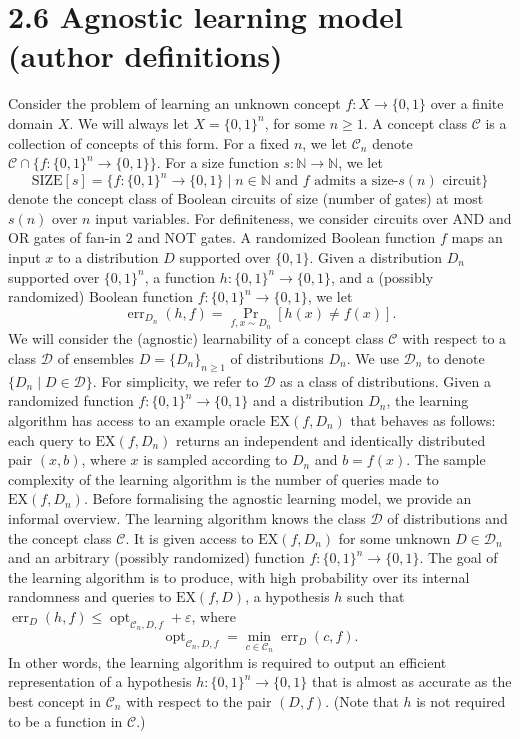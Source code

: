\section*{2.6 Agnostic learning model (author definitions)}
Consider the problem of learning an unknown concept $f:X\to\{0,1\}$ over a finite domain $X$. We will always let $X=\{0,1\}^n$, for some $n\geq1$. A concept class $\mathcal C$ is a collection of concepts of this form. For a fixed $n$, we let $\mathcal C_n$ denote $\mathcal C\cap\{f:\{0,1\}^n\to\{0,1\}\}$. For a size function $s:\mathbb N\to\mathbb N$, we let
\[\mathrm{SIZE}[s]=\{f:\{0,1\}^n\to\{0,1\}\mid n\in\mathbb N\text{ and }f\text{ admits a size-}s(n)\text{ circuit}\}\]
denote the concept class of Boolean circuits of size (number of gates) at most $s(n)$ over $n$ input variables. For definiteness, we consider circuits over AND and OR gates of fan-in $2$ and NOT gates.
A randomized Boolean function $f$ maps an input $x$ to a distribution $D$ supported over $\{0,1\}$. Given a distribution $D_n$ supported over $\{0,1\}^n$, a function $h:\{0,1\}^n\to\{0,1\}$, and a (possibly randomized) Boolean function $f:\{0,1\}^n\to\{0,1\}$, we let
\[\operatorname{err}_{D_n}(h,f)=\Pr_{f,x\sim D_n}[h(x)\neq f(x)].\]
We will consider the (agnostic) learnability of a concept class $\mathcal C$ with respect to a class $\mathcal D$ of ensembles $D=\{D_n\}_{n\geq1}$ of distributions $D_n$. We use $\mathcal D_n$ to denote $\{D_n\mid D\in\mathcal D\}$. For simplicity, we refer to $\mathcal D$ as a class of distributions.
Given a randomized function $f:\{0,1\}^n\to\{0,1\}$ and a distribution $D_n$, the learning algorithm has access to an example oracle $\mathrm{EX}(f,D_n)$ that behaves as follows: each query to $\mathrm{EX}(f,D_n)$ returns an independent and identically distributed pair $(x,b)$, where $x$ is sampled according to $D_n$ and $b=f(x)$. The sample complexity of the learning algorithm is the number of queries made to $\mathrm{EX}(f,D_n)$.
Before formalising the agnostic learning model, we provide an informal overview. The learning algorithm knows the class $\mathcal D$ of distributions and the concept class $\mathcal C$. It is given access to $\mathrm{EX}(f,D_n)$ for some unknown $D\in\mathcal D_n$ and an arbitrary (possibly randomized) function $f:\{0,1\}^n\to\{0,1\}$. The goal of the learning algorithm is to produce, with high probability over its internal randomness and queries to $\mathrm{EX}(f,D)$, a hypothesis $h$ such that $\operatorname{err}_D(h,f)\leq\operatorname{opt}_{\mathcal C_n,D,f}+\varepsilon$, where
\[\operatorname{opt}_{\mathcal C_n,D,f}=\min_{c\in\mathcal C_n}\operatorname{err}_D(c,f).\]
In other words, the learning algorithm is required to output an efficient representation of a hypothesis $h:\{0,1\}^n\to\{0,1\}$ that is almost as accurate as the best concept in $\mathcal C_n$ with respect to the pair $(D,f)$. (Note that $h$ is not required to be a function in $\mathcal C$.)
